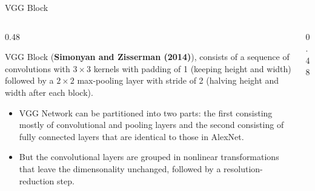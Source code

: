 \documentclass[aspectratio=169,xcolor=dvipsnames,svgnames,x11names,fleqn]{beamer}
\begin{document}
\begin{frame}{VGG Block}
\begin{columns}[T]
    \begin{column}{0.48\textwidth}
        \footnotesize
        \begin{tcolorbox}[colback=vggLightBlue!10, colframe=vggDeepBlue, arc=1mm, boxrule=0.5pt, left=2pt, right=2pt, top=2pt, bottom=2pt]
        VGG Block (\textbf{Simonyan and Zisserman (2014)}), consists of a sequence of convolutions with $3 \times 3$ kernels with padding of 1 (keeping height and width) followed by a $ 2\times 2$ max-pooling layer with stride of 2 (halving height and width after each block). 
        \end{tcolorbox}

        \vspace{5pt}

        \begin{itemize}
            \item VGG Network can be partitioned into two parts: the first consisting mostly of convolutional and pooling layers and the second consisting of fully connected layers that are identical to those in AlexNet. 
            \item But the convolutional layers are grouped in nonlinear transformations that leave the dimensonality unchanged, followed by a resolution-reduction step.
        \end{itemize}
    \end{column}

    \begin{column}{0.48\textwidth}
        \centering
\end{column}
\end{columns}
\end{frame}
\end{document}
